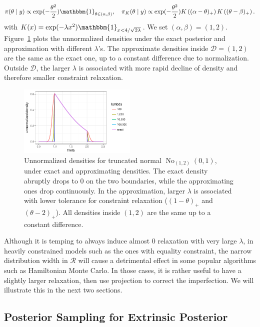 \documentclass[10pt]{article}
\newcommand{\mc}[1]{\mathcal{#1}}
\DeclareMathOperator{\No}{No}
\begin{document}
$$\pi(\theta\mid y)\propto \exp(-\frac{\theta^2}{2}) \mathbbm{1}_{\theta\in(\alpha,\beta)}, \quad \pi_K(\theta\mid y)\propto \exp(-\frac{\theta^2}{2}) K \left ( (\alpha - \theta)_+ \right) K \left ( ( \theta - \beta)_+ \right).$$
with $K(x)= \exp( - \lambda x^2)\mathbbm{1}_{x<4/\sqrt{2\lambda}}$. We set $(\alpha, \beta)=(1,2)$. Figure~\ref{truncated_normal} plots the unnormalized densities under the exact posterior and approximation with different $\lambda$'s. The approximate densities inside $\mc D = (1,2)$ are the same as the exact one, up to a constant difference due to normalization. Outside $\mc D$, the larger $\lambda$ is associated with more rapid decline of density and therefore smaller constraint relaxation.

\begin{figure}[H]
 \centering
 \includegraphics[width=0.5\textwidth]{density_truncated_normal}
\caption{Unnormalized densities for truncated normal $\No_{(1,2)}(0,1)$, under exact and approximating densities. The exact density abruptly drops to $0$ on the two boundaries, while the approximating ones drop continuously. In the approximation, larger $\lambda$ is associated with lower tolerance for constraint relaxation ($( 1-\theta )_+$ and $( \theta - 2)_+$). All densities inside $(1,2)$ are the same up to a constant difference.}
\label{truncated_normal}
\end{figure}

Although it is temping to always induce almost $0$ relaxation with very large $\lambda$, in heavily constrained models such as the ones with equality constraint, the narrow distribution width in $\mc R$ will cause a detrimental effect in some popular algorithms such as Hamiltonian Monte Carlo. In those cases, it is rather useful to have a slightly larger relaxation, then use projection to correct the imperfection. We will illustrate this in the next two sections.

\subsection{Posterior Sampling for Extrinsic Posterior}
\end{document}
